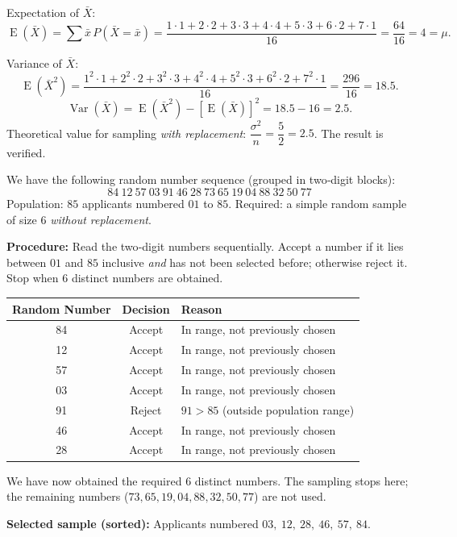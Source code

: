 \documentclass[11pt]{article}
\begin{document}
\begin{corrige}
\begin{enumerate}
Expectation of \(\bar{X}\):
\[
\operatorname{E}(\bar{X}) = \sum \bar{x}\,P(\bar{X}=\bar{x})
= \frac{1\cdot1 + 2\cdot2 + 3\cdot3 + 4\cdot4 + 5\cdot3 + 6\cdot2 + 7\cdot1}{16}
= \frac{64}{16} = 4 = \mu.
\]

Variance of \(\bar{X}\):
\[
\operatorname{E}(\bar{X}^2) = \frac{1^2\cdot1 + 2^2\cdot2 + 3^2\cdot3 + 4^2\cdot4 + 5^2\cdot3 + 6^2\cdot2 + 7^2\cdot1}{16}
= \frac{296}{16} = 18.5.
\]
\[
\operatorname{Var}(\bar{X}) = \operatorname{E}(\bar{X}^2) - [\operatorname{E}(\bar{X})]^2 = 18.5 - 16 = 2.5.
\]
Theoretical value for sampling \emph{with replacement}: \(\dfrac{\sigma^2}{n} = \dfrac{5}{2} = 2.5\). The result is verified.
\end{enumerate}
\end{corrige}

\begin{corrige}
We have the following random number sequence (grouped in two‑digit blocks):
\[
84\ 12\ 57\ 03\ 91\ 46\ 28\ 73\ 65\ 19\ 04\ 88\ 32\ 50\ 77
\]
Population: \(85\) applicants numbered \(01\) to \(85\). Required: a simple random sample of size \(6\) \emph{without replacement}.

\textbf{Procedure:} Read the two‑digit numbers sequentially. Accept a number if it lies between \(01\) and \(85\) inclusive \emph{and} has not been selected before; otherwise reject it. Stop when \(6\) distinct numbers are obtained.

\begin{center}
\begin{tabular}{|c|c|l|}
\hline
\textbf{Random Number} & \textbf{Decision} & \textbf{Reason} \\ \hline
84 & Accept & In range, not previously chosen \\
12 & Accept & In range, not previously chosen \\
57 & Accept & In range, not previously chosen \\
03 & Accept & In range, not previously chosen \\
91 & Reject & \(91 > 85\) (outside population range) \\
46 & Accept & In range, not previously chosen \\
28 & Accept & In range, not previously chosen \\ \hline
\end{tabular}
\end{center}

We have now obtained the required \(6\) distinct numbers. The sampling stops here; the remaining numbers (\(73, 65, 19, 04, 88, 32, 50, 77\)) are not used.

\textbf{Selected sample (sorted):} Applicants numbered \(03,\ 12,\ 28,\ 46,\ 57,\ 84\).
\end{corrige}
\end{document}
